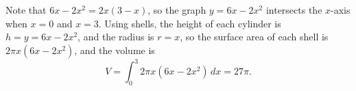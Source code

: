\documentclass[12pt]{article}
\begin{document}
\begin{enumerate}
Note that $6x-2x^2=2x(3-x)$, so the graph $y=6x-2x^2$ intersects the $x$-axis when $x=0$ and $x=3$. Using shells, the height of each cylinder is $h = y = 6x-2x^2$, and the radius is $r=x$, so the surface area of each shell is $2\pi x(6x-2x^2)$, and the volume is
\[
 V = \int_0^3 2\pi x(6x-2x^2)\,dx  = 27\pi.
\]
\end{enumerate}


\end{document}
